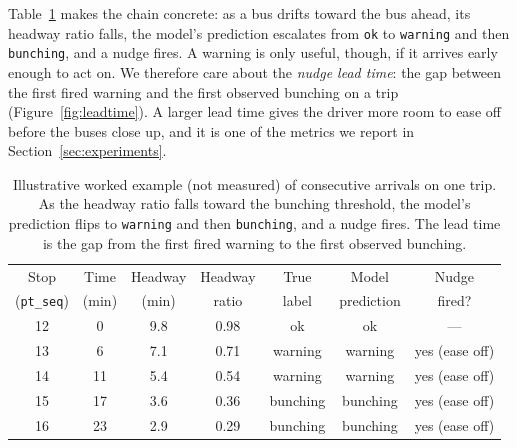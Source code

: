 \documentclass[11pt,a4paper]{article}
\begin{document}
Table~\ref{tab:worked} makes the chain concrete: as a bus drifts toward the bus ahead, its headway
ratio falls, the model's prediction escalates from \texttt{ok} to \texttt{warning} and then
\texttt{bunching}, and a nudge fires. A warning is only useful, though, if it arrives early enough to
act on. We therefore care about the \emph{nudge lead time}: the gap between the first fired warning
and the first observed bunching on a trip (Figure~\ref{fig:leadtime}). A larger lead time gives the
driver more room to ease off before the buses close up, and it is one of the metrics we report in
Section~\ref{sec:experiments}.

\begin{table}[htbp]
\centering
\caption{Illustrative worked example (not measured) of consecutive arrivals on one trip. As the
headway ratio falls toward the bunching threshold, the model's prediction flips to \texttt{warning}
and then \texttt{bunching}, and a nudge fires. The lead time is the gap from the first fired warning
to the first observed bunching.}
\label{tab:worked}
\footnotesize
\begin{tabular}{ccccccc}
\toprule
Stop & Time & Headway & Headway & True & Model & Nudge \\
(\texttt{pt\_seq}) & (min) & (min) & ratio & label & prediction & fired? \\
\midrule
12 & 0  & 9.8 & 0.98 & ok       & ok       & --- \\
13 & 6  & 7.1 & 0.71 & warning  & warning  & yes (ease off) \\
14 & 11 & 5.4 & 0.54 & warning  & warning  & yes (ease off) \\
15 & 17 & 3.6 & 0.36 & bunching & bunching & yes (ease off) \\
16 & 23 & 2.9 & 0.29 & bunching & bunching & yes (ease off) \\
\bottomrule
\end{tabular}
\end{table}
\end{document}
